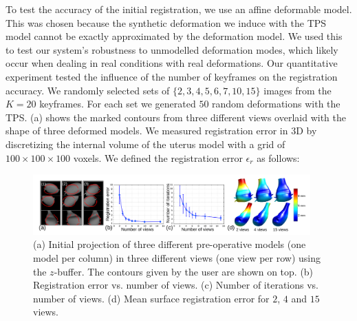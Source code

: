 %
To test the accuracy of the initial registration, we use an affine deformable model. This was chosen because the synthetic deformation we induce with the TPS model cannot be exactly approximated by the deformation model. We used this to test our system's robustness to unmodelled deformation modes, which likely occur when dealing in real conditions with real deformations.
Our quantitative experiment tested the influence of the number of keyframes on the registration accuracy. We randomly selected sets of $\{2,3,4,5,6,7,10,15\}$ images from the $K=20$ keyframes. For each set we generated $50$ random deformations with the TPS. (a) shows the marked contours from three different views overlaid with the shape of three deformed models. We measured registration error in 3D by discretizing the internal volume of the uterus model with a grid of $100\times 100 \times 100$ voxels. We defined the registration error $\epsilon_r$ as follows:
\begin{figure}[htbp]
  \centering
  \includegraphics[width=0.95\textwidth]{./figs/errors.pdf}
\caption{(a) Initial projection of three different pre-operative models (one model per column) in three different views (one view per row) using the $z$-buffer. The contours given by the user are shown on top. (b) Registration error vs. number of views. (c) Number of iterations vs. number of views. (d) Mean surface registration error for $2$, $4$ and $15$ views.}
\label{fig:results}
\end{figure}
